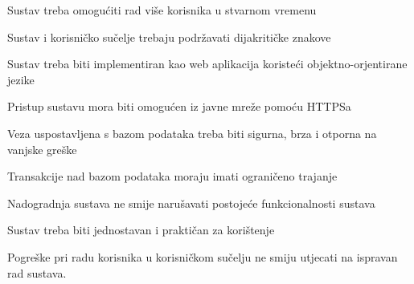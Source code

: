 			
	\begin{packed_item}
	
		\item {Sustav treba omogućiti rad više korisnika u stvarnom vremenu}
		\item {Sustav i korisničko sučelje trebaju podržavati dijakritičke znakove}	
		\item {Sustav treba biti implementiran kao web aplikacija koristeći objektno-orjentirane jezike}
		\item {Pristup sustavu mora biti omogućen iz javne mreže pomoću HTTPSa}
		\item {Veza uspostavljena s bazom podataka treba biti sigurna, brza i otporna na vanjske greške}
		\item {Transakcije nad bazom podataka moraju imati ograničeno trajanje}
		\item {Nadogradnja sustava ne smije narušavati postojeće funkcionalnosti sustava}
		\item {Sustav treba biti jednostavan i praktičan za korištenje}
		\item {Pogreške pri radu korisnika u korisničkom sučelju  ne smiju utjecati na ispravan rad sustava.}
	
	\end{packed_item}
		 	 
			 
			 
	